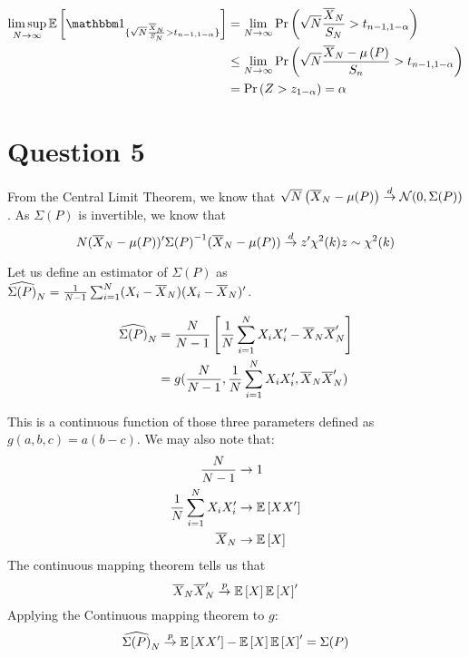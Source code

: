\documentclass[12pt]{paper}
\begin{document}
\begin{align*}
  \limsup_{N\rightarrow\infty} \exV{\indicate{ \sqrt{N} \frac{\mean{X}}{S_N} > t_{n-1,1-\alpha}}}
         &= \lim_{N\rightarrow\infty}\Pr\left( \sqrt{N} \frac{\mean{X}}{S_N} > t_{n-1,1-\alpha} \right)\\ 
         &\leq \lim_{N\rightarrow\infty}\Pr\left( \sqrt{N} \frac{\mean{X} - \mu\left(P\right)}{S_n} >  t_{n-1,1-\alpha}\right)\\
         &= \Pr\left( Z > z_{1-\alpha}\right) = \alpha 
\end{align*}



\section*{Question 5}

From the Central Limit Theorem, we know that $\sqrt{N} \left( \overline{ X }_{N}
- \mu(P)\right) \overset{d}{\to} \mathcal{N}(0,\Sigma(P))$. As $\Sigma(P)$ is invertible,
we know that
\begin{equation*}
  N ( \overline{ X }_{N} - \mu(P))' {\Sigma(P)}^{-1} ( \overline{ X }_{N} - \mu(P)) \overset{d}{\to}  z'
  \chi^2(k) z \sim \chi^2(k)
\end{equation*}

Let us define an estimator of $\Sigma(P)$ as $\widehat{ \Sigma(P) }_{N} = \frac{1}{N-1} \sum_{i = 1}^N
(X_i - \overline{ X }_{N})(X_i - \overline{ X }_{N})'$.

\begin{align*}
  \widehat{ \Sigma(P) }_{N} &= \frac{N}{N-1} \left [  \frac{1}{N} \sum_{i = 1}^N X_i X_i'
               - \overline{ X }_{N} \overline{ X }_{N}'  \right ]\\
  &= g( \frac{N}{N-1}, \frac{1}{N}\sum_{i=1}^N X_i X_i', \overline{ X }_{N} \overline{ X }_{N}')
\end{align*}

This is a continuous function of those three parameters defined as
$g(a,b,c) = a(b-c)$. We may also note that:
\begin{align*}
  \frac{N}{N-1} &\rightarrow 1\\
  \frac{1}{N}\sum_{i=1}^N X_i X_i' &\rightarrow \mathbb{E} \left [ X X' \right ]\\
  \overline{ X }_{N} &\to \mathbb{E} \left [ X \right ]  
\end{align*}
The continuous mapping theorem tells us that
\begin{equation*}
\overline{ X }_{N} \overline{ X }_{N}' \overset{p}{\to} \mathbb{E} \left [ X \right ] \mathbb{E} \left [ X \right ]'  
\end{equation*}
Applying the Continuous mapping theorem to $g$:
\begin{equation*}
  \widehat{ \Sigma(P) }_{N} \overset{p}{\to} \mathbb{E} \left [ X X' \right ] - \mathbb{E} \left [ X \right ] \mathbb{E} \left [ X \right ]' = \Sigma(P)
\end{equation*}
\end{document}
